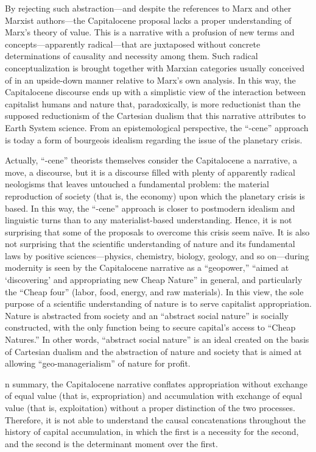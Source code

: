 \documentclass[
]{book}
\begin{document}
By rejecting such abstraction---and despite the references to Marx and other Marxist authors---the Capitalocene proposal lacks a proper understanding of Marx's theory of value. This is a narrative with a profusion of new terms and concepts---apparently radical---that are juxtaposed without concrete determinations of causality and necessity among them. Such radical conceptualization is brought together with Marxian categories usually conceived of in an upside-down manner relative to Marx's own analysis. In this way, the Capitalocene discourse ends up with a simplistic view of the interaction between capitalist humans and nature that, paradoxically, is more reductionist than the supposed reductionism of the Cartesian dualism that this narrative attributes to Earth System science. From an epistemological perspective, the ``-cene'' approach is today a form of bourgeois idealism regarding the issue of the planetary crisis.

Actually, ``-cene'' theorists themselves consider the Capitalocene a narrative, a move, a discourse, but it is a discourse filled with plenty of apparently radical neologisms that leaves untouched a fundamental problem: the material reproduction of society (that is, the economy) upon which the planetary crisis is based. In this way, the ``-cene'' approach is closer to postmodern idealism and linguistic turns than to any materialist-based understanding. Hence, it is not surprising that some of the proposals to overcome this crisis seem naïve. It is also not surprising that the scientific understanding of nature and its fundamental laws by positive sciences---physics, chemistry, biology, geology, and so on---during modernity is seen by the Capitalocene narrative as a ``geopower,'' ``aimed at `discovering' and appropriating new Cheap Nature'' in general, and particularly the ``Cheap four'' (labor, food, energy, and raw materials). In this view, the sole purpose of a scientific understanding of nature is to serve capitalist appropriation. Nature is abstracted from society and an ``abstract social nature'' is socially constructed, with the only function being to secure capital's access to ``Cheap Natures.'' In other words, ``abstract social nature'' is an ideal created on the basis of Cartesian dualism and the abstraction of nature and society that is aimed at allowing ``geo-managerialism'' of nature for profit.

n summary, the Capitalocene narrative conflates appropriation without exchange of equal value (that is, expropriation) and accumulation with exchange of equal value (that is, exploitation) without a proper distinction of the two processes. Therefore, it is not able to understand the causal concatenations throughout the history of capital accumulation, in which the first is a necessity for the second, and the second is the determinant moment over the first.
\end{document}
